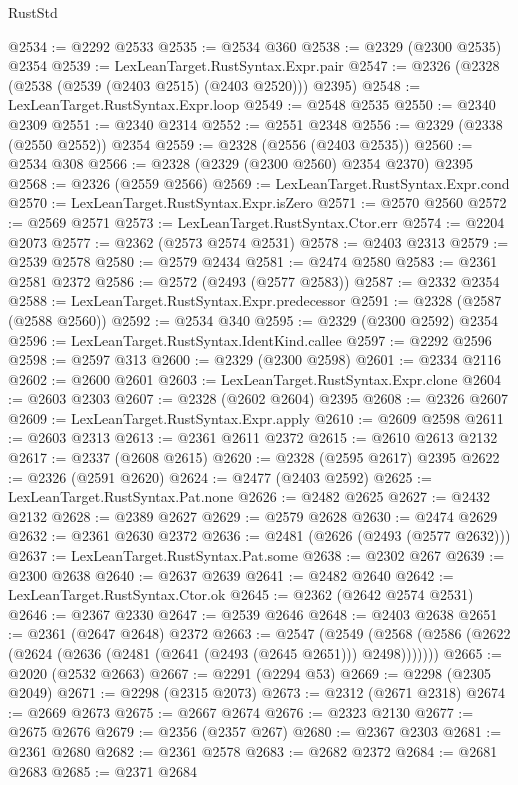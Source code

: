 \begin{lexlean}{RustStd}
\begin{coremodule}
{\begin{coremodule}
{{{{{{{{{{{{{{{{{{{{{{{{{{{{{{{{{{{{{@2534 := @2292 @2533
@2535 := @2534 @360
@2538 := @2329 (@2300 @2535) @2354
@2539 := LexLeanTarget.RustSyntax.Expr.pair
@2547 := @2326 (@2328 (@2538 (@2539 (@2403 @2515) (@2403 @2520))) @2395)
@2548 := LexLeanTarget.RustSyntax.Expr.loop
@2549 := @2548 @2535
@2550 := @2340 @2309
@2551 := @2340 @2314
@2552 := @2551 @2348
@2556 := @2329 (@2338 (@2550 @2552)) @2354
@2559 := @2328 (@2556 (@2403 @2535))
@2560 := @2534 @308
@2566 := @2328 (@2329 (@2300 @2560) @2354 @2370) @2395
@2568 := @2326 (@2559 @2566)
@2569 := LexLeanTarget.RustSyntax.Expr.cond
@2570 := LexLeanTarget.RustSyntax.Expr.isZero
@2571 := @2570 @2560
@2572 := @2569 @2571
@2573 := LexLeanTarget.RustSyntax.Ctor.err
@2574 := @2204 @2073
@2577 := @2362 (@2573 @2574 @2531)
@2578 := @2403 @2313
@2579 := @2539 @2578
@2580 := @2579 @2434
@2581 := @2474 @2580
@2583 := @2361 @2581 @2372
@2586 := @2572 (@2493 (@2577 @2583))
@2587 := @2332 @2354
@2588 := LexLeanTarget.RustSyntax.Expr.predecessor
@2591 := @2328 (@2587 (@2588 @2560))
@2592 := @2534 @340
@2595 := @2329 (@2300 @2592) @2354
@2596 := LexLeanTarget.RustSyntax.IdentKind.callee
@2597 := @2292 @2596
@2598 := @2597 @313
@2600 := @2329 (@2300 @2598)
@2601 := @2334 @2116
@2602 := @2600 @2601
@2603 := LexLeanTarget.RustSyntax.Expr.clone
@2604 := @2603 @2303
@2607 := @2328 (@2602 @2604) @2395
@2608 := @2326 @2607
@2609 := LexLeanTarget.RustSyntax.Expr.apply
@2610 := @2609 @2598
@2611 := @2603 @2313
@2613 := @2361 @2611 @2372
@2615 := @2610 @2613 @2132
@2617 := @2337 (@2608 @2615)
@2620 := @2328 (@2595 @2617) @2395
@2622 := @2326 (@2591 @2620)
@2624 := @2477 (@2403 @2592)
@2625 := LexLeanTarget.RustSyntax.Pat.none
@2626 := @2482 @2625
@2627 := @2432 @2132
@2628 := @2389 @2627
@2629 := @2579 @2628
@2630 := @2474 @2629
@2632 := @2361 @2630 @2372
@2636 := @2481 (@2626 (@2493 (@2577 @2632)))
@2637 := LexLeanTarget.RustSyntax.Pat.some
@2638 := @2302 @267
@2639 := @2300 @2638
@2640 := @2637 @2639
@2641 := @2482 @2640
@2642 := LexLeanTarget.RustSyntax.Ctor.ok
@2645 := @2362 (@2642 @2574 @2531)
@2646 := @2367 @2330
@2647 := @2539 @2646
@2648 := @2403 @2638
@2651 := @2361 (@2647 @2648) @2372
@2663 := @2547
    (@2549 (@2568 (@2586 (@2622 (@2624 (@2636 (@2481 (@2641 (@2493 (@2645 @2651))) @2498)))))))
@2665 := @2020 (@2532 @2663)
@2667 := @2291 (@2294 @53)
@2669 := @2298 (@2305 @2049)
@2671 := @2298 (@2315 @2073)
@2673 := @2312 (@2671 @2318)
@2674 := @2669 @2673
@2675 := @2667 @2674
@2676 := @2323 @2130
@2677 := @2675 @2676
@2679 := @2356 (@2357 @267)
@2680 := @2367 @2303
@2681 := @2361 @2680
@2682 := @2361 @2578
@2683 := @2682 @2372
@2684 := @2681 @2683
@2685 := @2371 @2684
}}}}}}}}}}}}}}}}}}}}}}}}}}}}}}}}}}}}}
\end{coremodule}}
\end{coremodule}
\end{lexlean}
